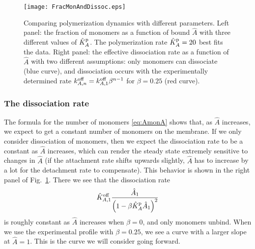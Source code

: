 \documentclass[11pt]{article}
\newcommand{\6}[1]{#1_{\text{6}}}
\newcommand{\3}[1]{#1_{\text{3}}}
\begin{document}
\begin{figure}
\centering
\texttt{[image: FracMonAndDissoc.eps]}
\caption{\label{fig:FracMonDissoc}Comparing polymerization dynamics with different parameters. Left panel: the fraction of monomers as a function of bound $\hat A$ with three different values of $\hat{K}^\text{p}_A$. The polymerization rate $\hat{K}^\text{p}_A=20$ best fits the data. Right panel: the effective dissociation rate as a function of $\hat A$ with two different assumptions: only monomers can dissociate (blue curve), and dissociation occurs with the experimentally determined rate $k^\text{off}_{A,n}=k^\text{off}_{A,1} \beta^{n-1}$ for $\beta=0.25$ (red curve).}
\end{figure}

\subsubsection{The dissociation rate}
The formula for the number of monomers \eqref{eq:AmonA} shows that, as $\hat A$ increases, we expect to get a constant number of monomers on the membrane. If we only consider dissociation of monomers, then we expect the dissociation rate to be a constant as $\hat A$ increases, which can render the steady state extremely sensitive to changes in $\hat A$ (if the attachment rate shifts upwards slightly, $\hat A$ has to increase by a lot for the detachment rate to compensate). This behavior is shown in the right panel of Fig.\ \ref{fig:FracMonDissoc}. There we see that the dissociation rate 
\begin{equation}
\label{eq:Dissoc}
\hat{K}^\text{off}_{A,1}  \frac{\hat A_1}{\left(1-\beta \hat{K}^\text{p}_A \hat A_1\right)^2}
\end{equation}
is roughly constant as $\hat A$ increases when $\beta=0$, and only monomers unbind. When we use the experimental profile with $\beta=0.25$, we see a curve with a larger slope at $\hat A=1$. This is the curve we will consider going forward.
\end{document}
